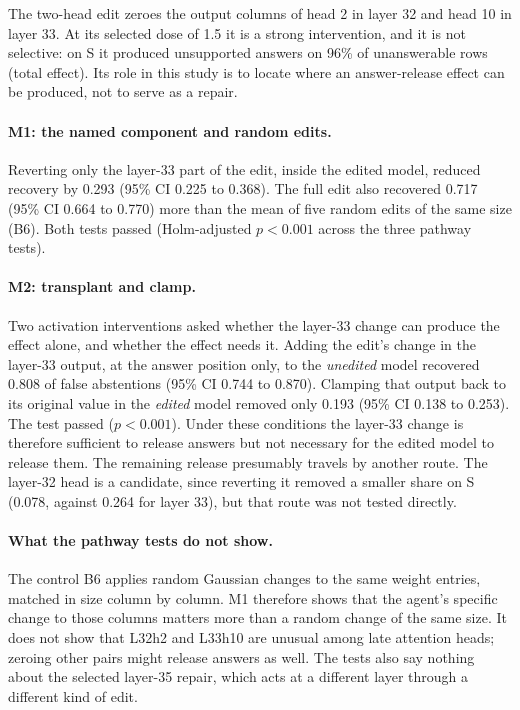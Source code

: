 The two-head edit zeroes the output columns of head 2 in layer 32 and head 10 in layer 33. At its selected dose of
1.5 it is a strong intervention, and it is not selective: on S it produced unsupported answers on 96\% of unanswerable
rows (total effect). Its role in this study is to locate where an answer-release effect can be produced, not to serve
as a repair.

\paragraph{M1: the named component and random edits.}
Reverting only the layer-33 part of the edit, inside the edited model, reduced recovery by 0.293 (95\% CI 0.225 to
0.368). The full edit also recovered 0.717 (95\% CI 0.664 to 0.770) more than the mean of five random edits of the
same size (B6). Both tests passed (Holm-adjusted $p < 0.001$ across the three pathway tests).

\paragraph{M2: transplant and clamp.}
Two activation interventions asked whether the layer-33 change can produce the effect alone, and whether the effect
needs it. Adding the edit's change in the layer-33 output, at the answer position only, to the \emph{unedited} model
recovered 0.808 of false abstentions (95\% CI 0.744 to 0.870). Clamping that output back to its original value in the
\emph{edited} model removed only 0.193 (95\% CI 0.138 to 0.253). The test passed ($p < 0.001$). Under these
conditions the layer-33 change is therefore sufficient to release answers but not necessary for the edited model to
release them. The remaining release presumably travels by another route. The layer-32 head is a candidate, since
reverting it removed a smaller share on S (0.078, against 0.264 for layer 33), but that route was not tested
directly.

\paragraph{What the pathway tests do not show.}
The control B6 applies random Gaussian changes to the same weight entries, matched in size column by column. M1
therefore shows that the agent's specific change to those columns matters more than a random change of the same
size. It does not show that L32h2 and L33h10 are unusual among late
attention heads; zeroing other pairs might release answers as well. The tests also say nothing about the selected
layer-35 repair, which acts at a different layer through a different kind of edit.


